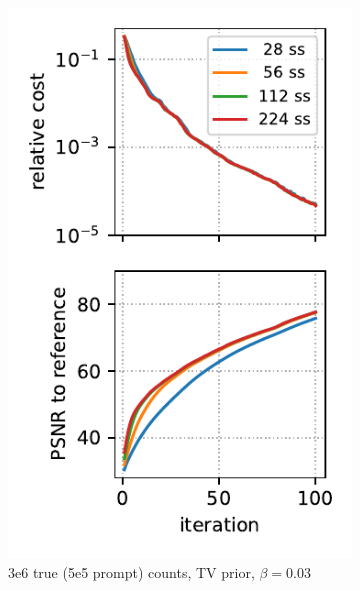 \begin{figure}
\begin{subfigure}[b]{0.23\textwidth}
    \includegraphics[width=1.0\textwidth]{./figure5c_brain2d_counts_3.0E+06_seed_1_beta_3.0E-02_prior_TV_niter_ref_20000_fwhm_4.5_4.5_niter_100_ss.pdf}
    \caption{3e6 true (5e5 prompt) counts, TV prior, $\beta = 0.03$}
  \end{subfigure}
  \hfill
  \begin{subfigure}[b]{0.23\textwidth}
    \centering

\end{subfigure}
\end{figure}
